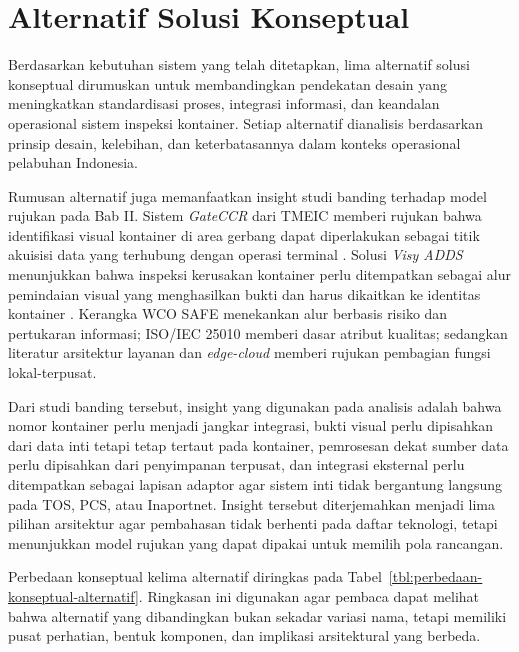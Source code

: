 \section{Alternatif Solusi Konseptual}

Berdasarkan kebutuhan sistem yang telah ditetapkan, lima alternatif solusi
konseptual dirumuskan untuk membandingkan pendekatan desain yang meningkatkan
standardisasi proses, integrasi informasi, dan keandalan
operasional sistem inspeksi kontainer. Setiap alternatif dianalisis berdasarkan
prinsip desain, kelebihan, dan keterbatasannya dalam konteks operasional
pelabuhan Indonesia.

Rumusan alternatif juga memanfaatkan insight studi banding terhadap model
rujukan pada Bab II. Sistem \textit{GateCCR} dari TMEIC memberi rujukan bahwa
identifikasi visual kontainer di area gerbang dapat diperlakukan sebagai titik
akuisisi data yang terhubung dengan operasi terminal \autocite{tmeic2023}.
Solusi \textit{Visy ADDS} menunjukkan bahwa inspeksi kerusakan kontainer perlu
ditempatkan sebagai alur pemindaian visual yang menghasilkan bukti dan harus
dikaitkan ke identitas kontainer
\autocite{visy2023}. Kerangka WCO SAFE menekankan alur berbasis risiko dan
pertukaran informasi; ISO/IEC 25010 memberi dasar atribut kualitas; sedangkan
literatur arsitektur layanan dan \textit{edge-cloud} memberi rujukan pembagian
fungsi lokal-terpusat.

Dari studi banding tersebut, insight yang digunakan pada analisis adalah bahwa
nomor kontainer perlu menjadi jangkar integrasi, bukti visual perlu dipisahkan
dari data inti tetapi tetap tertaut pada kontainer, pemrosesan dekat sumber data
perlu dipisahkan dari penyimpanan terpusat, dan integrasi eksternal perlu
ditempatkan sebagai lapisan adaptor agar sistem inti tidak bergantung langsung
pada TOS, PCS, atau Inaportnet. Insight tersebut diterjemahkan menjadi lima
pilihan arsitektur agar pembahasan tidak berhenti pada daftar teknologi, tetapi
menunjukkan model rujukan yang dapat dipakai untuk memilih pola rancangan.

Perbedaan konseptual kelima alternatif diringkas pada
Tabel~\ref{tbl:perbedaan-konseptual-alternatif}. Ringkasan ini digunakan agar
pembaca dapat melihat bahwa alternatif yang dibandingkan bukan sekadar variasi
nama, tetapi memiliki pusat perhatian, bentuk komponen, dan implikasi
arsitektural yang berbeda.

